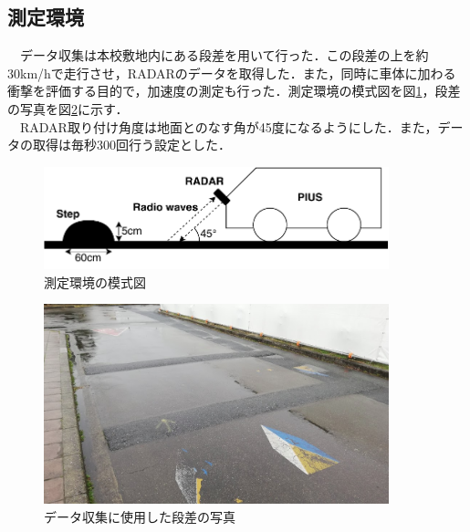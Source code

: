 \subsection{測定環境}
　データ収集は本校敷地内にある段差を用いて行った．この段差の上を約30km/hで走行させ，RADARのデータを取得した．また，同時に車体に加わる衝撃を評価する目的で，加速度の測定も行った．測定環境の模式図を図\ref{fig:RADAR_MountingPosition}，段差の写真を図\ref{fig:step}に示す．\\
　RADAR取り付け角度は地面とのなす角が45度になるようにした．また，データの取得は毎秒300回行う設定とした．
\begin{figure}[H]
    \centering
    \includegraphics[width=10cm]{./fig/RADAR_MountingPosition.pdf}
    \caption{測定環境の模式図}
    \label{fig:RADAR_MountingPosition}
\end{figure}
\begin{figure}[H]
    \centering
    \includegraphics[width=10cm]{./fig/step.png}
    \caption{データ収集に使用した段差の写真}
    \label{fig:step}
\end{figure}

